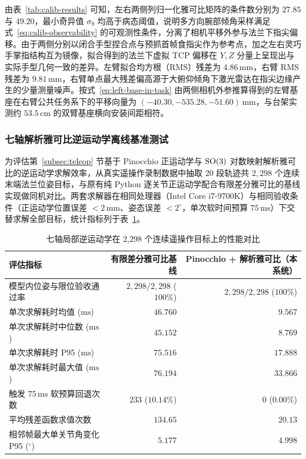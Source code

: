 由表~\ref{tab:calib-results} 可知，左右两侧列归一化雅可比矩阵的条件数分别为 $27.85$ 与 $49.20$，最小奇异值 $\sigma_9$ 均高于病态阈值，说明多方向腕部倾角采样满足式~\eqref{eq:calib-observability} 的可观测性条件，分离了相机平移外参与法兰下指尖偏移。由于两侧分别以闭合手型捏合点与预抓首帧食指尖作为参考点，加之左右灵巧手掌指结构互为镜像，拟合得到的法兰下虚拟 TCP 偏移在 $Y, Z$ 分量上呈现出与实际手型几何一致的差异。左臂拟合均方根（RMS）残差为 $4.86\,\mathrm{mm}$，右臂 RMS 残差为 $9.81\,\mathrm{mm}$，右臂单点最大残差偏高源于大俯仰倾角下激光雷达在指尖边缘产生的少量测量噪声。按式~\eqref{eq:left-base-in-task} 由两侧相机外参推算得到的左臂基座在右臂公共任务系下的平移向量为 $(-40.30, -535.28, -51.60)\,\mathrm{mm}$，与台架实测约 $53.5\,\mathrm{cm}$ 的双臂基座横向安装间距相符。

\subsubsection{七轴解析雅可比逆运动学离线基准测试}

为评估第~\ref{subsec:teleop} 节基于 Pinocchio 正运动学与 $\mathrm{SO}(3)$ 对数映射解析雅可比的逆运动学求解效率，从真实遥操作录制数据中抽取 20 段轨迹共 $2,298$ 个连续末端法兰位姿目标，与原有纯 Python 逐关节正运动学配合有限差分雅可比的基线实现做同机对比。两套求解器在相同处理器（Intel Core i7-9700K）与相同验收条件（正运动学位置误差 $<2\,\mathrm{mm}$、姿态误差 $<2^{\circ}$，单次软时间预算 $75\,\mathrm{ms}$）下交替求解全部目标，统计指标列于表~\ref{tab:ik-benchmark}。

\begin{table}[htbp]
\centering
\caption{七轴局部逆运动学在 2,298 个连续遥操作目标上的性能对比}
\label{tab:ik-benchmark}
\small
\begin{tabular}{@{}lrr@{}}
  \toprule
  评估指标 & 有限差分雅可比基线 & Pinocchio + 解析雅可比（本系统） \\
  \midrule
  模型内位姿与限位验收通过率 & $2,298 / 2,298$ ($100\%$) & $2,298 / 2,298$ ($100\%$) \\
  单次求解耗时均值 ($\mathrm{ms}$)   & $46.760$ & $9.567$ \\
  单次求解耗时中位数 ($\mathrm{ms}$) & $45.152$ & $8.769$ \\
  单次求解耗时 P95 ($\mathrm{ms}$)    & $75.516$ & $17.888$ \\
  单次求解耗时最大值 ($\mathrm{ms}$) & $76.194$ & $33.866$ \\
  触发 $75\,\mathrm{ms}$ 软预算回退次数 & $233$ ($10.14\%$) & $0$ ($0.00\%$) \\
  平均残差函数求值次数 & $134.65$ & $20.13$ \\
  相邻帧最大单关节角变化 P95 ($^{\circ}$) & $5.177$ & $4.998$ \\
  \bottomrule
\end{tabular}
\end{table}

